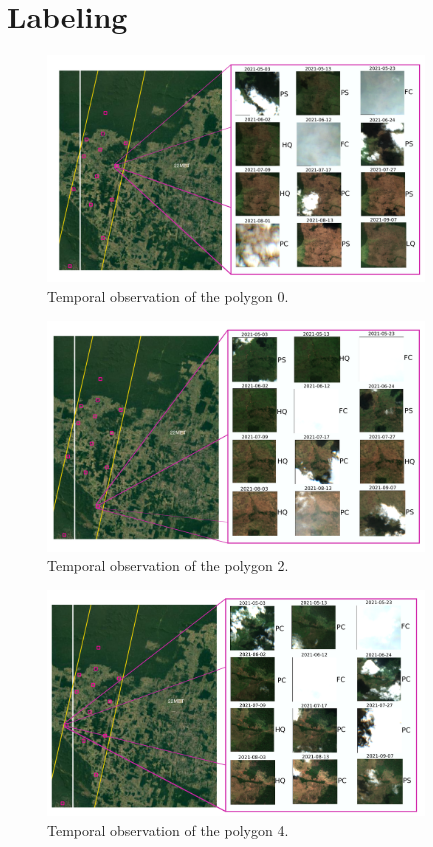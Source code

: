 \documentclass{beamer}
\begin{document}
\section{Labeling}
\begin{frame}
    \begin{figure}
        \includegraphics[width=10cm]{Figures/v3/labeling/polygon_0.pdf}
        \caption{Temporal observation of the polygon 0.}  
        \centering
    \end{figure}
\end{frame}

\begin{frame}
    \begin{figure}
        \includegraphics[width=10cm]{Figures/v3/labeling/polygon_2.pdf}
        \caption{Temporal observation of the polygon 2.}  
        \centering
    \end{figure}
\end{frame}

\begin{frame}
    \begin{figure}
        \includegraphics[width=10cm]{Figures/v3/labeling/polygon_4.pdf}
        \caption{Temporal observation of the polygon 4.}  
        \centering
    \end{figure}
\end{frame}
\end{document}
